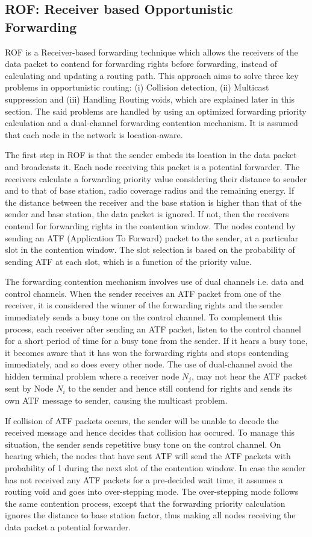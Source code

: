 \subsection{ROF: Receiver based Opportunistic Forwarding}
ROF is a Receiver-based forwarding technique which allows the receivers of the data packet to contend for forwarding rights before forwarding, instead of calculating and updating a routing path. This approach aims to solve three key problems in opportunistic routing: (i) Collision detection, (ii) Multicast suppression and (iii) Handling Routing voids, which are explained later in this section. The said problems are handled by using an optimized forwarding priority calculation and a dual-channel forwarding contention mechanism. It is assumed that each node in the network is location-aware. 

The first step in ROF is that the sender embeds its location in the data packet and broadcasts it. Each node receiving this packet is a potential forwarder. The receivers calculate a forwarding priority value considering their distance to sender and to that of base station, radio coverage radius and the remaining energy. If the distance between the receiver and the base station is higher than that of the sender and base station, the data packet is ignored. If not, then the receivers contend for forwarding rights in the contention window. The nodes contend by sending an ATF (Application To Forward) packet to the sender, at a particular slot in the contention window. The slot selection is based on the probability of sending ATF at each slot, which is a function of the priority value. 

The forwarding contention mechanism involves use of dual channels i.e. data and control channels. When the sender receives an ATF packet from one of the receiver, it is considered the winner of the forwarding rights and the sender immediately sends a busy tone on the control channel. To complement this process, each receiver after sending an ATF packet, listen to the control channel for a short period of time for a busy tone from the sender. If it hears a busy tone, it becomes aware that it has won the forwarding rights and stops contending immediately, and so does every other node. The use of dual-channel avoid the hidden terminal problem where a receiver node $N_j$, may not hear the ATF packet sent by Node $N_i$ to the sender and hence still contend for rights and sends its own ATF message to sender, causing the multicast problem. 

If collision of ATF packets occurs, the sender will be unable to decode the received message and hence decides that collision has occured. To manage this situation, the sender sends repetitive busy tone on the control channel. On hearing which, the nodes that have sent ATF will send the ATF packets with probability of 1 during the next slot of the contention window. In case the sender has not received any ATF packets for a pre-decided wait time, it assumes a routing void and goes into over-stepping mode. The over-stepping mode follows the same contention process, except that the forwarding priority calculation ignores the distance to base station factor, thus making all nodes receiving the data packet a potential forwarder. 


